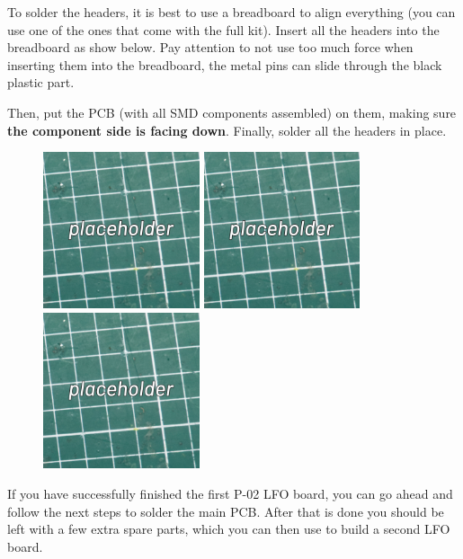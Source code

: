 \documentclass[12pt, a4paper]{article}
\begin{document}
To solder the headers, it is best to use a breadboard to align everything (you can use one of
the ones that come with the full kit). Insert all the headers into the breadboard as show
below. Pay attention to not use too much force when inserting them into the breadboard, the
metal pins can slide through the black plastic part.

Then, put the PCB (with all SMD components assembled) on them, making sure \textbf{the component
side is facing down}. Finally, solder all the headers in place.

\begin{figure}[H]
    \centering
    \includegraphics[width=46mm]{images/placeholder.jpg}
    \hspace{2mm}
    \includegraphics[width=46mm]{images/placeholder.jpg}
    \hspace{2mm}
    \includegraphics[width=46mm]{images/placeholder.jpg}
\end{figure}

If you have successfully finished the first P-02 LFO board, you can go ahead and follow the next
steps to solder the main PCB. After that is done you should be left with a few extra spare
parts, which you can then use to build a second LFO board.
\end{document}
